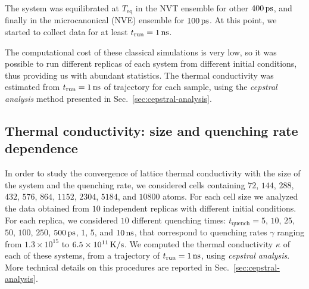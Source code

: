 The system was equilibrated at $T_{\mathrm{eq}}$ in the NVT ensemble for other $400\,\mathrm{ps}$, and finally in the microcanonical (NVE) ensemble for $100\,\mathrm{ps}$. 
At this point, we started to collect data for at least $t_{\mathrm{run}} = 1\,\mathrm{ns}$. 

The computational cost of these classical simulations is very low, so it was possible to run different replicas of each system from different initial conditions, thus providing us with abundant statistics. 
The thermal conductivity was estimated from $t_{\mathrm{run}} = 1\,\mathrm{ns}$ of trajectory for each sample, using the \emph{cepstral analysis} method presented in Sec.~\ref{sec:cepstral-analysis}.



\subsection{Thermal conductivity: size and quenching rate dependence}  \label{sec:results-class-quench}
In order to study the convergence of lattice thermal conductivity with the size of the system and the quenching rate, we considered cells containing $72$, $144$, $288$, $432$, $576$, $864$, $1152$, $2304$, $5184$, and $10800$ atoms. For each cell size we analyzed the data obtained from $10$ independent replicas with different initial conditions. 
For each replica, we considered $10$ different quenching times: $t_{\mathrm{quench}} = 5$, $10$, $25$, $50$, $100$, $250$, $500\,\mathrm{ps}$, $1$, $5$, and $10\,\mathrm{ns}$, that correspond to quenching rates $\gamma$ ranging from $1.3\times 10^{15}$ to $6.5\times 10^{11}\,\mathrm{K/s}$.
We computed the thermal conductivity $\kappa$ of each of these systems, from a trajectory of $t_\mathrm{run}=1\,\mathrm{ns}$, using \emph{cepstral analysis}. More technical details on this procedures are reported in Sec.~\ref{sec:cepstral-analysis}. 

